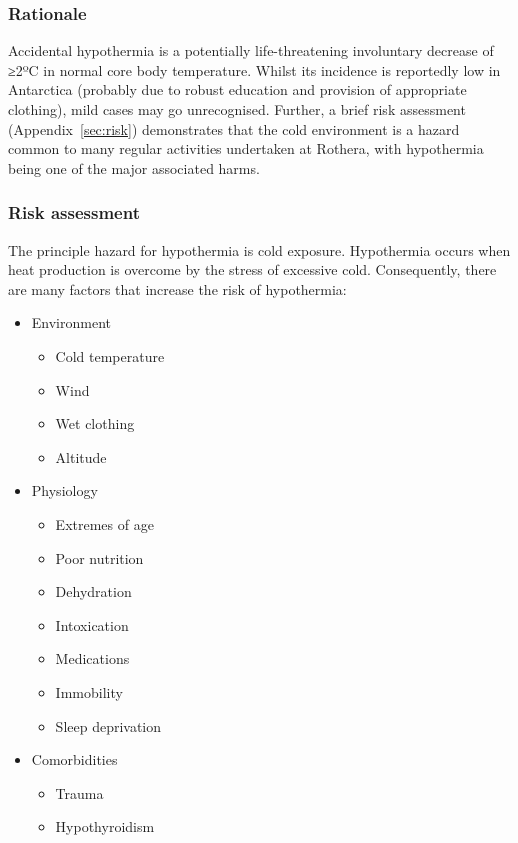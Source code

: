 \documentclass[12pt,a4paper]{article}
\begin{document}
\subsubsection{Rationale}

Accidental hypothermia is a potentially life-threatening involuntary decrease of ≥2ºC in normal core body temperature. Whilst its incidence is reportedly low in Antarctica\cite{BritishAntarcticSurveyMedicalUnit:2013vj} (probably due to robust education and provision of appropriate clothing), mild cases may go unrecognised.\cite{Brown:2012ja} Further, a brief risk assessment (Appendix~\ref{sec:risk}) demonstrates that the cold environment is a hazard common to many regular activities undertaken at Rothera, with hypothermia being one of the major associated harms.

\subsubsection{Risk assessment}

The principle hazard for hypothermia is cold exposure. Hypothermia occurs when heat production is overcome by the stress of excessive cold. Consequently, there are many factors that increase the risk of hypothermia:

\begin{itemize}
    \item Environment
    \begin{itemize}
        \item Cold temperature
        \item Wind
        \item Wet clothing
        \item Altitude
    \end{itemize}
    \item Physiology
    \begin{itemize}
        \item Extremes of age
        \item Poor nutrition
        \item Dehydration
        \item Intoxication
        \item Medications
        \item Immobility
        \item Sleep deprivation
    \end{itemize}
    \item Comorbidities
        \begin{itemize}
            \item Trauma
            \item Hypothyroidism
        \end{itemize}
\end{itemize}
\end{document}
